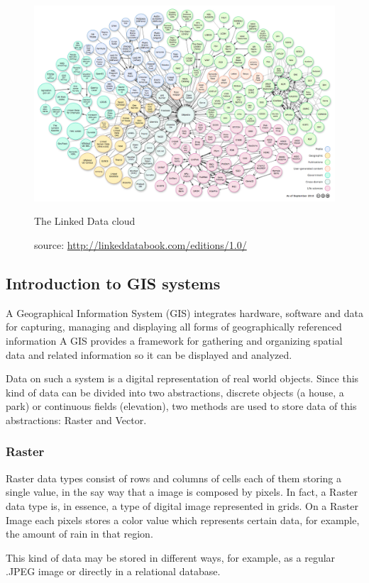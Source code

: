 \begin{figure}[ht]
  \centering
  \includegraphics[width=.6\textwidth]{fig/linked-data-cloud}
  \caption{The Linked Data cloud}
  \caption*{source: \url{http://linkeddatabook.com/editions/1.0/}}
  \label{fig:linked-data-cloud}
\end{figure} 

\subsection{Introduction to GIS systems}

A Geographical Information System (GIS) integrates hardware, software and data for capturing, managing and displaying all forms of geographically referenced information \cite{esrigis} A GIS provides a framework for gathering and organizing spatial data and related information so it can be displayed and analyzed.

Data on such a system is a digital representation of real world objects. Since this kind of data can be divided into two abstractions, discrete objects (a house, a park) or continuous fields (elevation), two methods are used to store data of this abstractions: Raster and Vector. \cite{giswikigis}

\subsubsection*{Raster}

Raster data types consist of rows and columns of cells each of them storing a single value, in the say way that a image is composed by pixels. In fact, a Raster data type is, in essence, a type of digital image represented in grids. On a Raster Image each pixels stores a color value which represents certain data, for example, the amount of rain in that region.

This kind of data may be stored in different ways, for example, as a regular .JPEG image or directly in a relational database.

